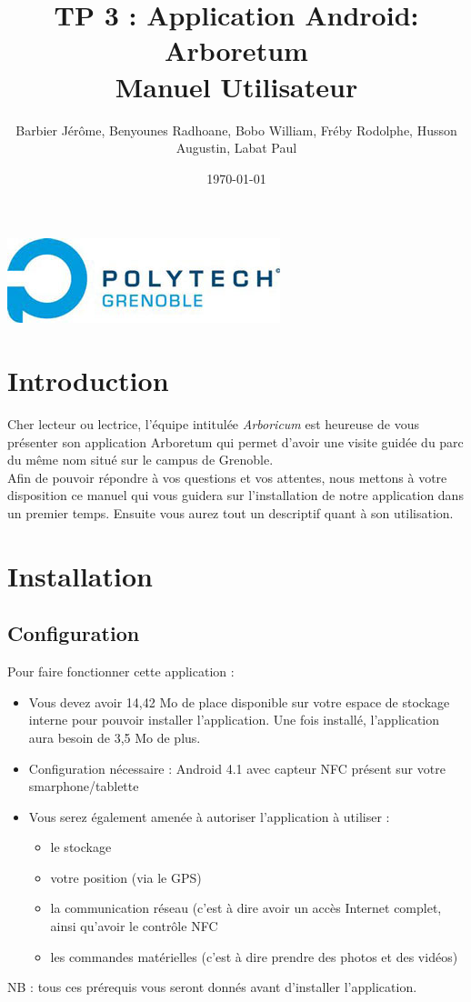 \documentclass[a4paper,11pt]{article}
\title{TP 3 : Application Android: Arboretum\\
Manuel Utilisateur}
\author{Barbier Jérôme, Benyounes Radhoane, Bobo William, Fréby Rodolphe, Husson Augustin, Labat Paul}
\date{\today}
\begin{document}
  \maketitle

  \begin{center}
    \includegraphics{logoPol.jpg}\\
  \end{center}
  \tableofcontents
  \newpage
  
  \section{Introduction}
    Cher lecteur ou lectrice, l'équipe intitulée \textit{Arboricum} est heureuse de vous présenter son application Arboretum qui permet d'avoir une visite 
    guidée du parc du même nom situé sur le campus de Grenoble. \\
    Afin de pouvoir répondre à vos questions et vos attentes, nous mettons à votre disposition ce manuel qui vous guidera sur l'installation de
    notre application dans un premier temps. Ensuite vous aurez tout un descriptif quant à son utilisation.
  \section{Installation}
    \subsection{Configuration}
    Pour faire fonctionner cette application : 
    \begin{itemize}
     \item Vous devez avoir 14,42 Mo de place disponible sur votre espace de stockage interne pour pouvoir installer l'application. Une fois installé, l'application
     aura besoin de 3,5 Mo de plus.
     \item Configuration nécessaire : Android 4.1 avec capteur NFC présent sur votre smarphone/tablette
     \item Vous serez également amenée à autoriser l'application à utiliser : 
     \begin{itemize}
      \item le stockage
      \item votre position (via le GPS)
      \item la communication réseau (c'est à dire avoir un accès Internet complet, ainsi qu'avoir le contrôle NFC
      \item les commandes matérielles (c'est à dire prendre des photos et des vidéos)
     \end{itemize}
    \end{itemize}
NB : tous ces prérequis vous seront donnés avant d'installer l'application.
\end{document}
